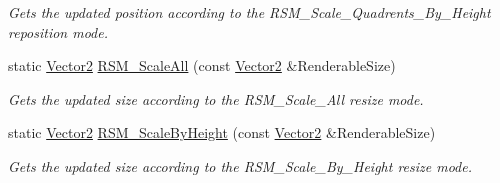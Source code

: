 \begin{DoxyCompactItemize}
\begin{DoxyCompactList}\small\item\em Gets the updated position according to the RSM\_\-Scale\_\-Quadrents\_\-By\_\-Height reposition mode. \item\end{DoxyCompactList}\item 
\hypertarget{classMezzanine_1_1UI_1_1ViewportUpdateTool_afeecde482a13a9f8843d6b11d3228dba}{
static \hyperlink{classMezzanine_1_1Vector2}{Vector2} \hyperlink{classMezzanine_1_1UI_1_1ViewportUpdateTool_afeecde482a13a9f8843d6b11d3228dba}{RSM\_\-ScaleAll} (const \hyperlink{classMezzanine_1_1Vector2}{Vector2} \&RenderableSize)}
\label{classMezzanine_1_1UI_1_1ViewportUpdateTool_afeecde482a13a9f8843d6b11d3228dba}

\begin{DoxyCompactList}\small\item\em Gets the updated size according to the RSM\_\-Scale\_\-All resize mode. \item\end{DoxyCompactList}\item 
\hypertarget{classMezzanine_1_1UI_1_1ViewportUpdateTool_a6707656afc037a31722eacb2af14f6ee}{
static \hyperlink{classMezzanine_1_1Vector2}{Vector2} \hyperlink{classMezzanine_1_1UI_1_1ViewportUpdateTool_a6707656afc037a31722eacb2af14f6ee}{RSM\_\-ScaleByHeight} (const \hyperlink{classMezzanine_1_1Vector2}{Vector2} \&RenderableSize)}
\label{classMezzanine_1_1UI_1_1ViewportUpdateTool_a6707656afc037a31722eacb2af14f6ee}

\begin{DoxyCompactList}\small\item\em Gets the updated size according to the RSM\_\-Scale\_\-By\_\-Height resize mode. \item\end{DoxyCompactList}\end{DoxyCompactItemize}
